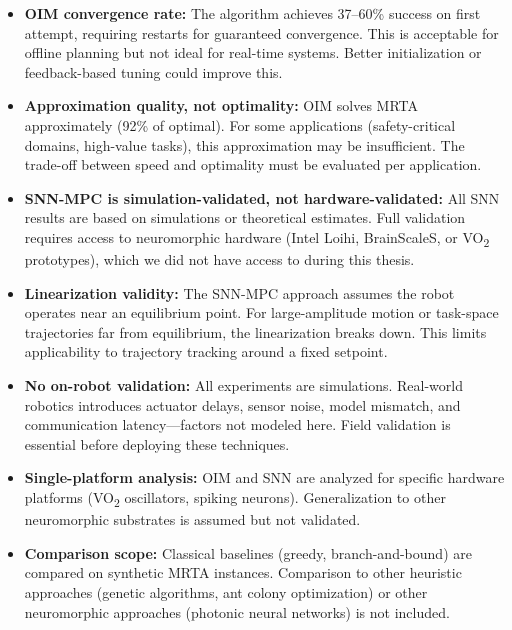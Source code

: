 \begin{itemize}
\item \textbf{OIM convergence rate:} The algorithm achieves 37--60\% success on first attempt, requiring restarts for guaranteed convergence. This is acceptable for offline planning but not ideal for real-time systems. Better initialization or feedback-based tuning could improve this.

\item \textbf{Approximation quality, not optimality:} OIM solves MRTA approximately (92\% of optimal). For some applications (safety-critical domains, high-value tasks), this approximation may be insufficient. The trade-off between speed and optimality must be evaluated per application.

\item \textbf{SNN-MPC is simulation-validated, not hardware-validated:} All SNN results are based on simulations or theoretical estimates. Full validation requires access to neuromorphic hardware (Intel Loihi, BrainScaleS, or VO\textsubscript{2} prototypes), which we did not have access to during this thesis.

\item \textbf{Linearization validity:} The SNN-MPC approach assumes the robot operates near an equilibrium point. For large-amplitude motion or task-space trajectories far from equilibrium, the linearization breaks down. This limits applicability to trajectory tracking around a fixed setpoint.

\item \textbf{No on-robot validation:} All experiments are simulations. Real-world robotics introduces actuator delays, sensor noise, model mismatch, and communication latency---factors not modeled here. Field validation is essential before deploying these techniques.

\item \textbf{Single-platform analysis:} OIM and SNN are analyzed for specific hardware platforms (VO\textsubscript{2} oscillators, spiking neurons). Generalization to other neuromorphic substrates is assumed but not validated.

\item \textbf{Comparison scope:} Classical baselines (greedy, branch-and-bound) are compared on synthetic MRTA instances. Comparison to other heuristic approaches (genetic algorithms, ant colony optimization) or other neuromorphic approaches (photonic neural networks) is not included.
\end{itemize}

